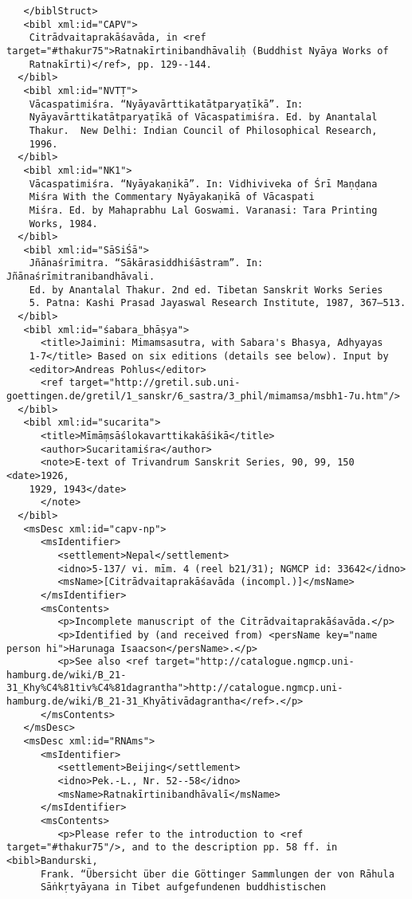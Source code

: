 \documentclass[article,a4paper]{memoir}
\begin{document}
\begin{verbatim}
   </biblStruct>
   <bibl xml:id="CAPV">
    Citrādvaitaprakāśavāda, in <ref target="#thakur75">Ratnakīrtinibandhāvaliḥ (Buddhist Nyāya Works of
    Ratnakīrti)</ref>, pp. 129--144.
  </bibl>
   <bibl xml:id="NVTṬ">
    Vācaspatimiśra. “Nyāyavārttikatātparyaṭīkā”. In:
    Nyāyavārttikatātparyaṭīkā of Vācaspatimiśra. Ed. by Anantalal
    Thakur.  New Delhi: Indian Council of Philosophical Research,
    1996.
  </bibl>
   <bibl xml:id="NK1">
    Vācaspatimiśra. “Nyāyakaṇikā”. In: Vidhiviveka of Śrī Maṇḍana
    Miśra With the Commentary Nyāyakaṇikā of Vācaspati
    Miśra. Ed. by Mahaprabhu Lal Goswami. Varanasi: Tara Printing
    Works, 1984.
  </bibl>
   <bibl xml:id="SāSiŚā">
    Jñānaśrīmitra. “Sākārasiddhiśāstram”. In: Jñānaśrīmitranibandhāvali.
    Ed. by Anantalal Thakur. 2nd ed. Tibetan Sanskrit Works Series
    5. Patna: Kashi Prasad Jayaswal Research Institute, 1987, 367–513.
  </bibl>
   <bibl xml:id="śabara_bhāṣya">
      <title>Jaimini: Mimamsasutra, with Sabara's Bhasya, Adhyayas
    1-7</title> Based on six editions (details see below). Input by
    <editor>Andreas Pohlus</editor>
      <ref target="http://gretil.sub.uni-goettingen.de/gretil/1_sanskr/6_sastra/3_phil/mimamsa/msbh1-7u.htm"/>
  </bibl>
   <bibl xml:id="sucarita">
      <title>Mīmāṃsāślokavarttikakāśikā</title>
      <author>Sucaritamiśra</author>
      <note>E-text of Trivandrum Sanskrit Series, 90, 99, 150 <date>1926,
    1929, 1943</date>
      </note>  
  </bibl>
   <msDesc xml:id="capv-np">
      <msIdentifier>
         <settlement>Nepal</settlement>
         <idno>5-137/ vi. mīm. 4 (reel b21/31); NGMCP id: 33642</idno>
         <msName>[Citrādvaitaprakāśavāda (incompl.)]</msName>
      </msIdentifier>
      <msContents>
         <p>Incomplete manuscript of the Citrādvaitaprakāśavāda.</p>
         <p>Identified by (and received from) <persName key="name person hi">Harunaga Isaacson</persName>.</p>
         <p>See also <ref target="http://catalogue.ngmcp.uni-hamburg.de/wiki/B_21-31_Khy%C4%81tiv%C4%81dagrantha">http://catalogue.ngmcp.uni-hamburg.de/wiki/B_21-31_Khyātivādagrantha</ref>.</p>
      </msContents>
   </msDesc>
   <msDesc xml:id="RNAms">
      <msIdentifier>
         <settlement>Beijing</settlement>
         <idno>Pek.-L., Nr. 52--58</idno>
         <msName>Ratnakīrtinibandhāvalī</msName>
      </msIdentifier>
      <msContents>
         <p>Please refer to the introduction to <ref target="#thakur75"/>, and to the description pp. 58 ff. in <bibl>Bandurski,
      Frank. “Übersicht über die Göttinger Sammlungen der von Rāhula
      Sāṅkṛtyāyana in Tibet aufgefundenen buddhistischen

\end{verbatim}
\end{document}
